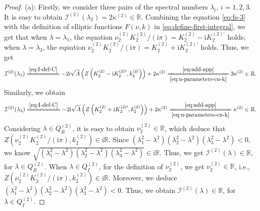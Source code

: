 \documentclass[11pt,reqno]{amsart}
\newcommand{\ii}{\mathrm{i}}
\numberwithin{equation}{section}
\begin{document}
\begin{proof}
	(a): Firstly, we consider three pairs of the spectral numbers $\lambda_i$, $i=1,2,3$. It is easy to obtain $\mathcal{I}^{(2)}(\lambda_2)=2\kappa^{(2)}\in \mathbb{R}$.
	Combining the equation \eqref{eq:fs-3} with the definition of elliptic functions $F(\nu,k)$ in \eqref{eq:define-first-integral}, we get that when $\lambda=\lambda_1$, the equation $\nu_{2}^{(2)}K_{2}^{(2)}/(\ii \pi)=K_{2}^{(2)}-\ii K_{2}^{(2)\prime}$ holds; when $\lambda=\lambda_3$, the equation $\nu_{2}^{(2)}K_{2}^{(2)}/(\ii \pi)=K_{2}^{(2)}+\ii K_{2}^{(2)\prime}$ holds.
	Thus, we get
	\begin{equation}\nonumber
		\mathcal{I}^{(2)}(\lambda_1)\xlongequal{\eqref{eq:I-def-C}}-2\ii \sqrt{A}\left(Z\left(K^{(2)}_2-\ii K^{(2)\prime}_2,  k^{(2)}_2\right)\right)+2\kappa^{(2)}
		\xlongequal[\eqref{eq:u-parameters-cn-k}]{\eqref{eq:add-app}}3 \kappa^{(2)}\in \mathbb{R}.
	\end{equation}
	 Similarly, we obtain
	 \begin{equation}\nonumber
	 	\mathcal{I}^{(2)}(\lambda_3)\xlongequal{\eqref{eq:I-def-C}}-2\ii \sqrt{A}\left(Z\left(K^{(2)}_2+\ii K^{(2)\prime}_2,  k^{(2)}_2\right)\right)+2\kappa^{(2)}
	 	\xlongequal[\eqref{eq:u-parameters-cn-k}]{\eqref{eq:add-app}} \kappa^{(2)}\in  \mathbb{R}.
	 \end{equation}
	Considering $\lambda\in Q_{R}^{(2)}$, it is easy to obtain $\nu_2^{(2)}\in \mathbb{R}$, which deduce that $Z(\nu_2^{(2)}K_2^{(2)}/(\ii \pi ),k_2^{(2)})\in \ii \mathbb{R}$. Since $\left(\lambda_1^2-\lambda^2\right)\left(\lambda_2^2-\lambda^2\right)\left(\lambda_3^2-\lambda^2\right)<0$, we know $\sqrt{\left(\lambda_1^2-\lambda^2\right)\left(\lambda_2^2-\lambda^2\right)\left(\lambda_3^2-\lambda^2\right)}\in \ii \mathbb{R}$. Thus, we get $\mathcal{I}^{(2)}(\lambda)\in \mathbb{R}$, for $\lambda\in Q_{R}^{(2)}$.
	When $\lambda\in Q_{I}^{(2)}$, for the definition of $\nu_2^{(2)}$, we get $\nu_2^{(2)}\in \mathbb{R}$, i.e., $Z(\nu_2^{(2)}K_2^{(2)}/(\ii \pi ),k_2^{(2)})\in \ii \mathbb{R}$. Moreover, we deduce $\left(\lambda_1^2-\lambda^2\right)\left(\lambda_2^2-\lambda^2\right)\left(\lambda_3^2-\lambda^2\right)<0$. Thus, we obtain $\mathcal{I}^{(2)}(\lambda)\in \mathbb{R}$, for $\lambda\in Q_{I}^{(2)}$.
		

\end{proof}
\end{document}

